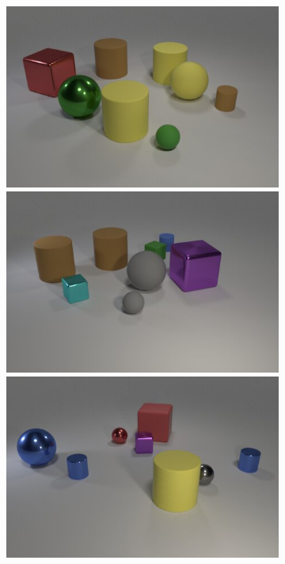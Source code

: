 \begin{figure}
\centering
\begin{subfigure}{.3225\linewidth}
\centering
\includegraphics[width=\linewidth]{figures/clevr/input/2.jpg}\\
\includegraphics[width=\linewidth]{figures/clevr/input/3.jpg}\\
\includegraphics[width=\linewidth]{figures/clevr/input/4.jpg}\\

\end{subfigure}
\end{figure}
